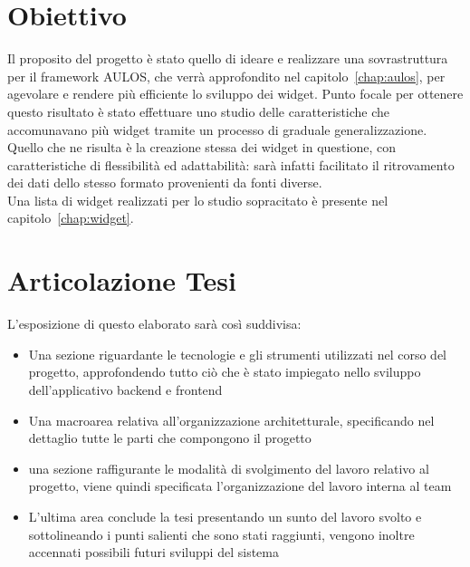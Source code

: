 \section{Obiettivo}
Il proposito del progetto è stato quello di ideare e realizzare una sovrastruttura per il framework AULOS, che verrà approfondito nel capitolo~\ref{chap:aulos}, per agevolare e rendere più efficiente lo sviluppo dei widget. Punto focale per ottenere questo risultato è stato effettuare uno studio delle caratteristiche che accomunavano più widget tramite un processo di graduale generalizzazione.
Quello che ne risulta è la creazione stessa dei widget in questione, con caratteristiche di flessibilità ed adattabilità: sarà infatti facilitato il ritrovamento dei dati dello stesso formato provenienti da fonti diverse. \\
Una lista di widget realizzati per lo studio sopracitato è presente nel capitolo~\ref{chap:widget}.

\section{Articolazione Tesi}
L'esposizione di questo elaborato sarà così suddivisa:
\begin{itemize}
    \item Una sezione riguardante le tecnologie e gli strumenti utilizzati nel corso del progetto, approfondendo tutto ciò che è stato impiegato nello sviluppo dell'applicativo backend e frontend
    \item Una macroarea relativa all'organizzazione architetturale, specificando nel dettaglio tutte le parti che compongono il progetto
    \item una sezione raffigurante le modalità di svolgimento del lavoro relativo al progetto, viene quindi specificata l'organizzazione del lavoro interna al team
    \item L'ultima area conclude la tesi presentando un sunto del lavoro svolto e sottolineando i punti salienti che sono stati raggiunti, vengono inoltre accennati possibili futuri sviluppi del sistema
\end{itemize}
